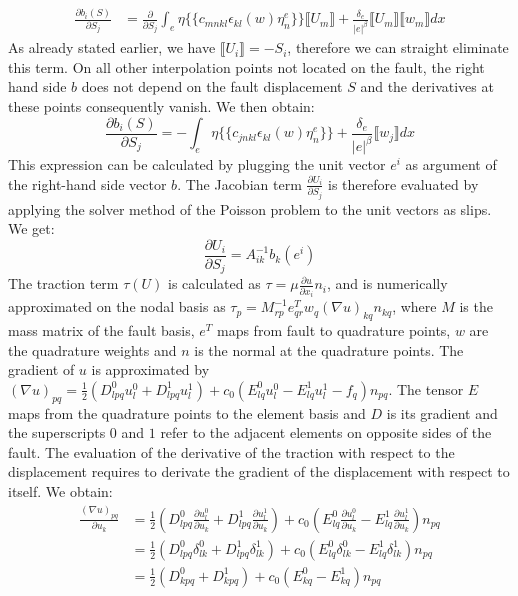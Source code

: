 \documentclass{report}
\begin{document}
\begin{align}
    \frac{\partial b_i(S)}{\partial S_j} &= \frac{\partial }{\partial S_j}\int_e \eta \{\{c_{mnkl}\epsilon_{kl}(w)\eta_n^e\}\}\llbracket U_m \rrbracket + \frac{\delta_e}{|e|^\beta}\llbracket U_m \rrbracket\llbracket w_m \rrbracket dx
\end{align}
As already stated earlier, we have $\llbracket U_i \rrbracket = -S_i$, therefore we can straight eliminate this term. On all other interpolation points not located on the fault, the right hand side $b$ does not depend on the fault displacement $S$ and the derivatives at these points consequently vanish. We then obtain:
\begin{equation}
    \frac{\partial b_i(S)}{\partial S_j} = -\int_e 
    \eta  \{\{c_{jnkl}\epsilon_{kl}(w)\eta_n^e\}\} +
    \frac{\delta_e}{|e|^\beta}\llbracket w_j \rrbracket dx
\end{equation}
This expression can be calculated by plugging the unit vector $e^i$ as argument of the right-hand side vector $b$. The Jacobian term $\frac{\partial U_i}{\partial S_j}$ is therefore evaluated by applying the solver method of the Poisson problem to the unit vectors as slips. We get:
\begin{equation}
    \frac{\partial U_i}{\partial S_j} = A_{ik}^{-1}b_k(e^i)
\end{equation}
The traction term $\tau(U)$ is calculated as $\tau = \mu \frac{\partial u}{\partial x_i}n_i$, and is numerically approximated on the nodal basis as $\tau_p = M_{rp}^{-1}e_{qr}^Tw_q(\nabla u)_{kq}n_{kq}$, where $M$ is the mass matrix of the fault basis, $e^T$ maps from fault to quadrature points, $w$ are the quadrature weights and $n$ is the normal at the quadrature points. The gradient of $u$ is approximated by $(\nabla u)_{pq} = \frac{1}{2}\left(D_{lpq}^0u_l^0 + D_{lpq}^1u_l^1\right) + c_0\left(E_{lq}^0u_l^0 - E_{lq}^1u_l^1 - f_q\right)n_{pq}$. The tensor $E$ maps from the quadrature points to the element basis and $D$ is its gradient and the superscripts $0$ and $1$ refer to the adjacent elements on opposite sides of the fault. The evaluation of the derivative of the traction with respect to the displacement requires to derivate the gradient of the displacement with respect to itself. We obtain: 
\begin{align}
    \frac{(\nabla u)_{pq}}{\partial u_k} &= \frac{1}{2}\left(D_{lpq}^0\frac{\partial u_l^0}{\partial u_k} + D_{lpq}^1\frac{\partial u_l^1}{\partial u_k}\right) + c_0\left(E_{lq}^0\frac{\partial u_l^0}{\partial u_k} - E_{lq}^1\frac{\partial u_l^1}{\partial u_k}\right)n_{pq} \\
    &= \frac{1}{2}\left(D_{lpq}^0\delta_{lk}^0 + D_{lpq}^1\delta_{lk}^1\right) + c_0\left(E_{lq}^0\delta_{lk}^0 - E_{lq}^1\delta_{lk}^1\right)n_{pq} \\
    &= \frac{1}{2}\left(D_{kpq}^0 + D_{kpq}^1\right) + c_0\left(E_{kq}^0 - E_{kq}^1\right)n_{pq} 
\end{align}
\end{document}
